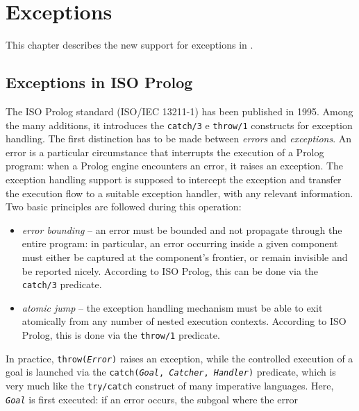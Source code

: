 \chapter{Exceptions}
\label{exceptions}

This chapter describes the new support for exceptions in \tuprolog{}.

\section{Exceptions in ISO Prolog}
\label{sec:exceptions in ISO prolog}
The ISO Prolog standard (ISO/IEC 13211-1) has been published in 1995. Among the many additions, it
introduces the \texttt{catch/3} e \texttt{throw/1} constructs for exception handling.
%
The first distinction has to be made between \textit{errors} and \textit{exceptions}. An error is
a particular circumstance that interrupts the execution of a Prolog program: when a Prolog engine
encounters an error, it raises an exception. The exception handling support is supposed to
intercept the exception and transfer the execution flow to a suitable exception handler, with any
relevant information. Two basic principles are followed during this operation:
\begin{itemize}
  \item \textit{error bounding} -- an error must be bounded and not propagate through the
      entire program: in particular, an error occurring inside a given component must either
      be captured at the component's frontier, or remain invisible and be reported nicely.
      According to ISO Prolog, this can be done via the \texttt{catch/3} predicate.
  \item \textit{atomic jump} -- the exception handling mechanism must be able to exit
      atomically from any number of nested execution contexts. According to ISO Prolog, this
      is done via the \texttt{throw/1} predicate.
\end{itemize}
%
In practice, \texttt{throw(\textit{Error})} raises an exception, while the controlled execution of
a goal is launched via the \texttt{catch(\textit{Goal}, \textit{Catcher}, \textit{Handler})}
predicate, which is very much like the \texttt{try/catch} construct of many imperative languages.
%
Here, \texttt{\textit{Goal}} is first executed: if an error occurs, the subgoal where the error
